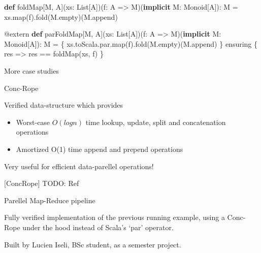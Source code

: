 \documentclass[
  ignorenonframetext,
]{beamer}
\newenvironment{Shaded}{}{}
\newcommand{\FunctionTok}[1]{\textcolor[rgb]{0.02,0.16,0.49}{#1}}
\newcommand{\KeywordTok}[1]{\textcolor[rgb]{0.00,0.44,0.13}{\textbf{#1}}}
\newcommand{\NormalTok}[1]{#1}
\providecommand{\tightlist}{%
  \setlength{\itemsep}{0pt}\setlength{\parskip}{0pt}}
\begin{document}
\begin{frame}[fragile]

\begin{Shaded}
\begin{Highlighting}[]
\KeywordTok{def}\NormalTok{ foldMap[M, A](xs: List[A])(f: A => M)(}\KeywordTok{implicit}\NormalTok{ M: Monoid[A]): M =}
\NormalTok{  xs.}\FunctionTok{map}\NormalTok{(f).}\FunctionTok{fold}\NormalTok{(M.}\FunctionTok{empty}\NormalTok{)(M.}\FunctionTok{append}\NormalTok{)}

\NormalTok{@extern}
\KeywordTok{def}\NormalTok{ parFoldMap[M, A](xs: List[A])(f: A => M)(}\KeywordTok{implicit}\NormalTok{ M: Monoid[A]): M = \{}
\NormalTok{  xs.}\FunctionTok{toScala}\NormalTok{.}\FunctionTok{par}\NormalTok{.}\FunctionTok{map}\NormalTok{(f).}\FunctionTok{fold}\NormalTok{(M.}\FunctionTok{empty}\NormalTok{)(M.}\FunctionTok{append}\NormalTok{)}
\NormalTok{\} ensuring \{ res =>}
\NormalTok{  res == }\FunctionTok{foldMap}\NormalTok{(xs, f)}
\NormalTok{\}}
\end{Highlighting}
\end{Shaded}

\end{frame}

\begin{frame}{More case studies}
\protect\hypertarget{more-case-studies}{}

\begin{block}{Conc-Rope}

Verified data-structure which provides

\begin{itemize}
\tightlist
\item
  Worst-case \(O(log n)\) time lookup, update, split and concatenation
  operations
\item
  Amortized O(1) time append and prepend operations
\end{itemize}

Very useful for efficient data-parellel operations!

{[}ConcRope{]} TODO: Ref

\end{block}

\end{frame}

\begin{frame}

\begin{block}{Parellel Map-Reduce pipeline}

Fully verified implementation of the previous running example, using a
Conc-Rope under the hood instead of Scala's `par' operator.

Built by Lucien Iseli, BSc student, as a semester project.

\end{block}

\end{frame}
\end{document}
